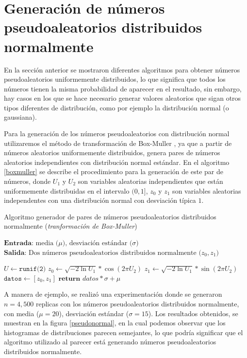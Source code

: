 \documentclass{article}
\begin{document}
\section{Generación de números pseudoaleatorios distribuidos normalmente}

En la sección anterior se mostraron diferentes algoritmos para obtener números pseudoaleatorios uniformemente distribuidos, lo que significa que todos los números tienen la misma probabilidad de aparecer en el resultado, sin embargo, hay casos en los que se hace necesario generar valores aleatorios que sigan otros tipos diferentes de distribución, como por ejemplo la distribución normal (o gaussiana). 

Para la generación de los números pseudoaleatorios con distribución normal utilizaremos el método de transformación de Box-Muller \cite{box}, ya que a partir de números aleatorios uniformemente distribuidos, genera pares de números aleatorios independientes con distribución normal estándar. En el algoritmo \ref{boxmuller} se describe el procedimiento para la generación de este par de números, donde $U_{1}$ y $U_{2}$ son variables aleatorias independientes que están uniformemente distribuidas en el intervalo $(0, 1]$, $z_{0}$ y
$z_{1}$ son variables aleatorias independentes con una distribución normal con desviación típica $1$.

\begin{algorithm}
	\caption{Algoritmo generador de pares de números pseudoaleatorios distribuidos normalmente (\emph{tranformación de Box-Muller})}
	\label{boxmuller}
	\SetAlgoLined
	\(\textbf{Entrada: } \text{media ($\mu$), desviación estándar ($\sigma$)}\)\;
	\(\textbf{Salida: } \text{Dos números pseudoaleatorios distribuidos normalmente ($z_{0}, z_{1}$)}\)\;

    \(U \leftarrow \texttt{runif(2)}\)\;
    \(z_{0} \leftarrow \sqrt{-2 \ln U_{1}} * \cos(2\pi U_{2})\)\;
    \(z_{1} \leftarrow \sqrt{-2 \ln U_{1}} * \sin(2\pi U_{2})\)\;
    \(\texttt{datos} \leftarrow [z_{0}, z_{1}] \)\;
    \(\textbf{return } datos * \sigma + \mu\)\;

\end{algorithm}

A manera de ejemplo, se realizó una experimentación donde se generaron $n=4,500$ replicas con los números pseudoaleatorios distribuidos normalmente, con media ($\mu = 20$), desviación estándar ($\sigma = 15$). Los resultados obtenidos, se muestran en la figura \ref{pseudonormal}, en la cual podemos observar que los histogramas de distribuciones parecen semejantes, lo que podría significar que el algoritmo utilizado al parecer está generando números pseudoaleatorios distribuidos normalmente.
\end{document}
